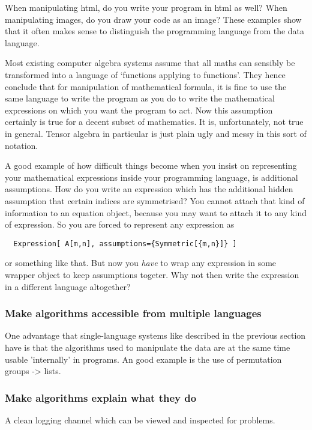 \documentclass[11pt]{article}
\begin{document}
When manipulating html, do you write your program in html as well?
When manipulating images, do you draw your code as an image? These
examples show that it often makes sense to distinguish the programming
language from the data language.

Most existing computer algebra systems assume that all maths can
sensibly be transformed into a language of `functions applying to
functions'. They hence conclude that for manipulation of mathematical
formula, it is fine to use the same language to write the program as
you do to write the mathematical expressions on which you want the
program to act. Now this assumption certainly is true for a decent
subset of mathematics. It is, unfortunately, not true in
general. Tensor algebra in particular is just plain ugly and messy in
this sort of notation.

A good example of how difficult things become when you insist on 
representing your mathematical expressions inside your programming language,
is additional assumptions. How do you write an expression which has the
additional hidden assumption that certain indices are symmetrised? 
You cannot attach that kind of information to an equation object, because you may 
want to attach it to any kind of expression. So you are forced to represent
any expression as
\begin{verbatim}
  Expression[ A[m,n], assumptions={Symmetric[{m,n}]} ]
\end{verbatim}
or something like that. But now you \emph{have} to wrap any expression
in some wrapper object to keep assumptions togeter. Why not then write
the expression in a different language altogether?

\subsubsection{Make algorithms accessible from multiple languages}

One advantage that single-language systems like described in the
previous section have is that the algorithms used to manipulate the
data are at the same time usable 'internally' in programs. An good
example is the use of permutation groups -> lists.

\subsubsection{Make algorithms explain what they do}

A clean logging channel which can be viewed and inspected for problems.
\end{document}
